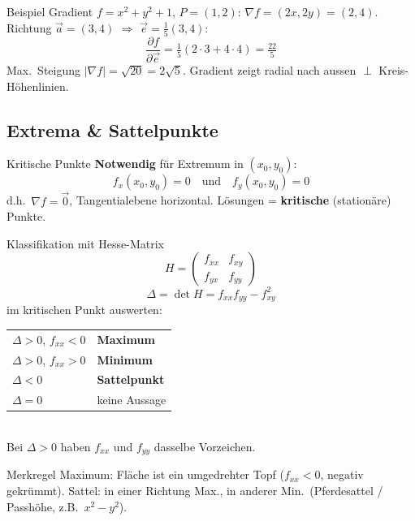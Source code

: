 \documentclass[a4paper, fontsize=7pt]{scrartcl}
\newcommand{\pdn}[2]{\frac{\partial #1}{\partial #2}}
\renewcommand*{\arraystretch}{1.5}  %
\begin{document}
\begin{subbox}{Beispiel Gradient}
$f = x^2 + y^2 + 1$, $P = (1, 2)$: $\nabla f = (2x, 2y) = (2, 4)$.\\
Richtung $\vec a = (3, 4)$ $\Rightarrow$ $\vec e = \frac{1}{5}(3, 4)$:
$$\pdn{f}{\vec e} = \tfrac{1}{5}(2 \cdot 3 + 4 \cdot 4) = \tfrac{22}{5}$$
Max.\ Steigung $|\nabla f| = \sqrt{20} = 2\sqrt 5$.
Gradient zeigt radial nach aussen $\perp$ Kreis-Höhenlinien.
\end{subbox}

\subsection{Extrema \& Sattelpunkte}

\begin{mainbox}{Kritische Punkte}
\textbf{Notwendig} für Extremum in $(x_0, y_0)$:
$$f_x(x_0, y_0) = 0 \quad \text{und} \quad f_y(x_0, y_0) = 0$$
d.h.\ $\nabla f = \vec 0$, Tangentialebene horizontal.
Lösungen = \textbf{kritische} (stationäre) Punkte.
\end{mainbox}

\begin{mainbox}{Klassifikation mit Hesse-Matrix}
$$H = \begin{pmatrix} f_{xx} & f_{xy} \\ f_{yx} & f_{yy} \end{pmatrix}$$
$$\Delta = \det H = f_{xx} f_{yy} - f_{xy}^2$$
im kritischen Punkt auswerten:\\[2pt]
\renewcommand*{\arraystretch}{1.3}
\begin{tabular}{@{}l|l@{}}
$\Delta > 0$, $f_{xx} < 0$ & \textbf{Maximum} \\
$\Delta > 0$, $f_{xx} > 0$ & \textbf{Minimum} \\
$\Delta < 0$ & \textbf{Sattelpunkt} \\
$\Delta = 0$ & keine Aussage \\
\end{tabular}\\[2pt]
Bei $\Delta > 0$ haben $f_{xx}$ und $f_{yy}$ dasselbe Vorzeichen.
\end{mainbox}

\begin{subbox}{Merkregel}
Maximum: Fläche ist ein umgedrehter Topf ($f_{xx} < 0$, negativ
gekrümmt). Sattel: in einer Richtung Max., in anderer Min.\
(Pferdesattel / Passhöhe, z.B.\ $x^2 - y^2$).
\end{subbox}
\end{document}
